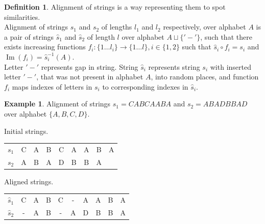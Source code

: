 \documentclass[a4paper, 12pt]{article}
\DeclareMathOperator{\Image}{Im}
\theoremstyle{definition}
\newtheorem{definition}{Definition}[section]
\theoremstyle{definition}
\newtheorem{example}{Example}[section]
\theoremstyle{remark}
\begin{document}
\begin{definition}
    Alignment of strings is a way representing them to spot similarities. \\
    Alignment of strings $s_1$ and $s_2$ of lengths $l_1$ and $l_2$ respectively, 
    over alphabet $A$ is a pair of strings $\hat{s}_1$ and $\hat{s}_2$ 
    of length $l$ over alphabet $A \sqcup \{ '-' \}$, 
    such that there exists increasing functions $f_i: \{1 \ldots l_i \} \rightarrow \{ 1 \ldots l\}, i \in \{1, 2\}$ 
    such that $\hat{s}_i \circ f_i = s_i$ and $\Image (f_i) = \hat{s}_i^{-1}(A)$. \\
    
    Letter $'-'$ represents gap in string. String $\hat{s}_i$ represents string $s_i$ with inserted letter $'-'$, that was not present in alphabet $A$,
    into random places, and function $f_i$ maps indexes of letters in $s_i$ to corresponding indexes in $\hat{s}_i$.
\end{definition}

\begin{example}
    Alignment of strings $s_1 = CABCAABA$ and $s_2 = ABADBBAD$ 
    over alphabet $\{ A, B, C, D\}$.

    \begin{center}
        Initial strings. \\
        \begin{tabular}{|| c | c c c c c c c c ||}
         $s_1$ & C & A & B & C & A & A & B & A \\ 
         $s_2$ & A & B & A & D & B & B & A &   \\    
        \end{tabular}

        \hfill \break 

        Aligned strings. \\
        \begin{tabular}{|| c | c c c c c c c c c ||}
            $\hat{s}_1$ & C & A & B & C & - & A & A & B & A \\ 
            $\hat{s}_2$ & - & A & B & - & A & D & B & B & A   
        \end{tabular}

    \end{center}
\end{example}
\end{document}
